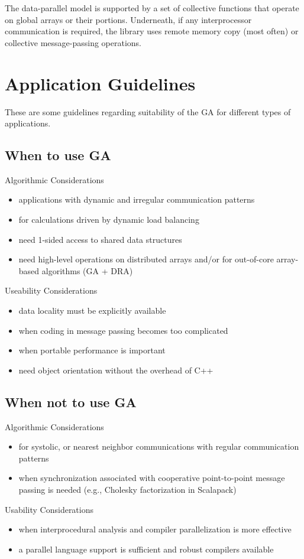 The data-parallel model is supported by a set of collective functions that
operate on global arrays or their portions. Underneath, if any interprocessor
communication is required, the library uses remote memory copy (most often) or
collective message-passing operations. 

\section{Application Guidelines}

These are some guidelines regarding suitability of the GA for different types
of applications. 

\subsection{When to use GA}

Algorithmic Considerations 
\begin{itemize}
\item applications with dynamic and irregular communication patterns 
\item for calculations driven by dynamic load balancing 
\item need 1-sided access to shared data structures 
\item need high-level operations on distributed arrays and/or for out-of-core
array-based algorithms (GA + DRA) 
\end{itemize}
Useability Considerations
\begin{itemize}
\item data locality must be explicitly available 
\item when coding in message passing becomes too complicated 
\item when portable performance is important 
\item need object orientation without the overhead of C++ 
\end{itemize}

\subsection{When not to use GA}

Algorithmic Considerations 
\begin{itemize}
\item for systolic, or nearest neighbor communications with regular
communication patterns 
\item when synchronization associated with cooperative point-to-point message
passing is needed (e.g., Cholesky factorization in Scalapack) 
\end{itemize}
Usability Considerations 
\begin{itemize}
\item when interprocedural analysis and compiler parallelization is more
effective 
\item a parallel language support is sufficient and robust compilers available 
\end{itemize}

